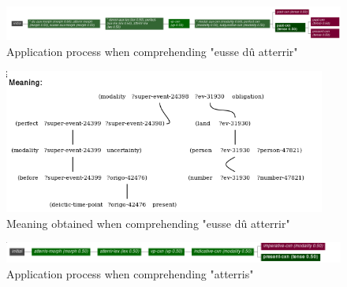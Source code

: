 \documentclass[a4paper,10pt]{article}
\begin{document}

\begin{figure}[!h]
    \centering
    \includegraphics[width=\textwidth]{application-process-mod-aux-subj-PQP.png}
    \caption{Application process when comprehending "eusse dû atterrir"}
    \label{application-process-mod-aux-subj-PQP}
\end{figure}

\begin{figure}[!h]
    \centering
    \includegraphics[width=400px]{meaning-mod-aux-subj-PQP.png}
    \caption{Meaning obtained when comprehending "eusse dû atterrir"}
    \label{meaning-mod-aux-subj-PQP}
\end{figure}


\begin{figure}[!h]
    \centering
    \includegraphics[width=\textwidth]{application-process-present.png}
    \caption{Application process when comprehending "atterris"}
    \label{application-process-present}
\end{figure}
\end{document}
